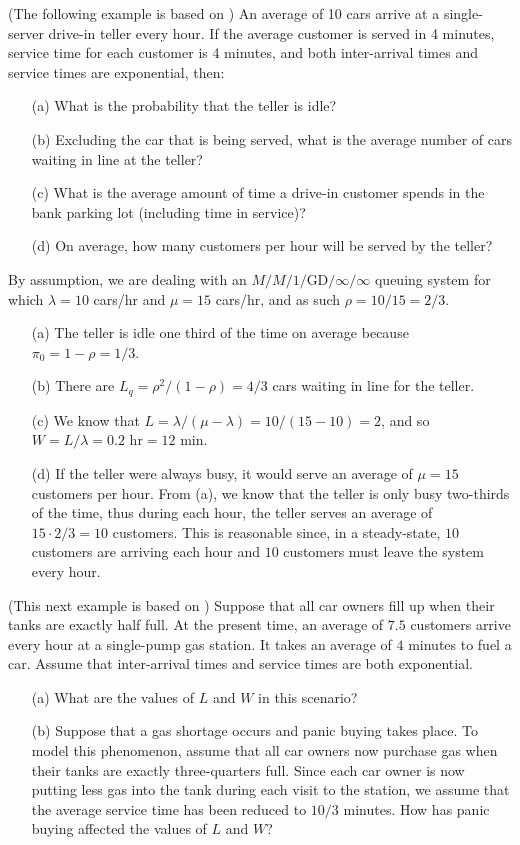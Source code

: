 \newl 
(The following example is based on \cite{QS_W}) An average of 10 cars arrive at a single-server drive-in teller every hour. If the average customer is served in 4 minutes, service time for each customer is 4 minutes, and both inter-arrival times and service times are exponential, then: \begin{itemize}[noitemsep]
	\item[(a)] What is the probability that the teller is idle? 
	\item[(b)] Excluding the car that is being served, what is the average number of cars waiting in line at the teller? 
	\item[(c)] What is the average amount of time a drive-in customer spends in the bank parking lot (including time in service)?
	\item[(d)] On average, how many customers per hour will be served by the teller?
\end{itemize}
By assumption, we are dealing with an $M/M/1/\textrm{GD}/\infty/\infty$ queuing system for which $\lambda = 10$ cars/hr and $\mu = 15$ cars/hr, and as such  $\rho = 10/15 = 2/3$.
\begin{itemize}[noitemsep]
	\item[(a)] The teller is idle one third of the time on average because $\pi_{0} = 1 - \rho = 1/3$.
	\item[(b)] There are $L_{q} = \rho^{2}/(1-\rho) = 4/3$ cars waiting in line for the teller. 
	\item[(c)] We know that $L = \lambda/(\mu - \lambda) = 10/(15-10) = 2$, and so $W = L/\lambda = 0.2 \textrm{ hr} = 12 \textrm{ min}$.
	\item[(d)] If the teller were always busy, it would serve an average of $\mu = 15$ customers per hour. From (a), we know that the teller is only busy two-thirds of the time, thus during each hour, the teller serves an average of $15 \cdot 2/3 = 10$ customers. This is reasonable since, in a steady-state, $10$ customers are arriving each hour and $10$ customers must leave the system every hour.
\end{itemize}
\newpage\noindent
(This next example is based on \cite{QS_E}) Suppose that all car owners fill up when their tanks are exactly half full.  At the present time, an average of $7.5$ customers arrive every hour at a single-pump gas station. It takes an average of $4$ minutes to fuel a car. Assume that inter-arrival times and service times are both exponential. \begin{itemize}[noitemsep]
	\item[(a)] What are the values of $L$ and $W$ in this scenario? 
	\item[(b)] Suppose that a gas shortage occurs and panic buying takes place. To model this phenomenon, assume that all car owners now purchase gas when their tanks are exactly three-quarters full. Since each car owner is now putting less gas into the tank during each visit to the station, we assume that the average service time has been reduced to $10/3$ minutes. How has panic buying affected the values of $L$ and $W$?
\end{itemize}
